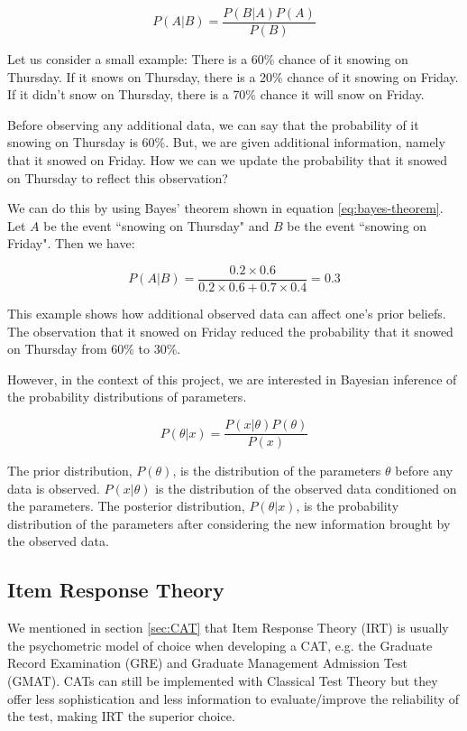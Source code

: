 \begin{equation} \label{eq:bayes-theorem}
P(A|B) = \dfrac{P(B|A)P(A)}{P(B)}
\end{equation}

Let us consider a small example: There is a 60\% chance of it snowing on Thursday. If it snows on Thursday, there is a 20\% chance of it snowing on Friday. If it didn't snow on Thursday, there is a 70\% chance it will snow on Friday.\newline

Before observing any additional data, we can say that the probability of it snowing on Thursday is 60\%. But, we are given additional information, namely that it snowed on Friday. How we can we update the probability that it snowed on Thursday to reflect this observation? \newline

We can do this by using Bayes' theorem shown in equation \eqref{eq:bayes-theorem}. Let $A$ be the event ``snowing on Thursday" and $B$ be the event ``snowing on Friday". Then we have:

$$P(A|B) = \dfrac{0.2 \times 0.6}{0.2 \times 0.6 + 0.7 \times 0.4} = 0.3$$

This example shows how additional observed data can affect one's prior beliefs. The observation that it snowed on Friday reduced the probability that it snowed on Thursday from 60\% to 30\%.
\newline

However, in the context of this project, we are interested in Bayesian inference of the probability distributions of parameters.

$$P(\theta|x) = \dfrac{P(x|\theta)P(\theta)}{P(x)}$$

The prior distribution, $P(\theta)$, is the distribution of the parameters $\theta$ before any data is observed. $P(x|\theta)$ is the distribution of the observed data conditioned on the parameters. The posterior distribution, $P(\theta|x)$, is the probability distribution of the parameters after considering the new information brought by the observed data.

\subsection{Item Response Theory}
\label{subsec:IRT}
We mentioned in section \ref{sec:CAT} that Item Response Theory (IRT) is usually the psychometric model of choice when developing a CAT, e.g. the Graduate Record Examination (GRE) and Graduate Management Admission Test (GMAT). CATs can still be implemented with Classical Test Theory but they offer less sophistication and less information to evaluate/improve the reliability of the test, making IRT the superior choice. \newline

